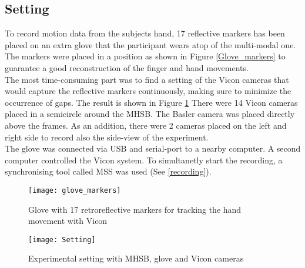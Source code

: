 \subsection{Setting}
To record motion data from the subjects hand, 17 reflective markers has been placed on an extra glove that the participant wears atop of the multi-modal one. The markers were placed in a position as shown in Figure \ref{Glove_markers} to guarantee a good reconstruction of the finger and hand movements.\\
The most time-consuming part was to find a setting of the Vicon cameras that would capture the reflective markers continuously, making sure to minimize the occurrence of gaps. The result is shown in Figure \ref{Setting} There were 14 Vicon cameras placed in a semicircle around the MHSB. The Basler camera was placed directly above the frames. As an addition, there were 2 cameras placed on the left and right side to record also the side-view of the experiment.\\
The glove was connected via USB and serial-port to a nearby computer. A second computer controlled the Vicon system. To simultanetly start the recording, a synchronising tool called MSS was used (See \ref{recording}).

\begin{figure}[H]
	\centering
	\begin{minipage}{0.49\textwidth}
		\centering
		\texttt{[image: glove\_markers]}
		\captionsetup{width=0.9\textwidth}
		\caption{Glove with 17 retroreflective markers for tracking the hand movement with Vicon}
		\label{Glove_markers}
	\end{minipage}
	\begin{minipage}{0.49\textwidth}
		\centering
		\texttt{[image: Setting]}
		\captionsetup{width=0.9\textwidth}
		\caption{Experimental setting with MHSB, glove and Vicon cameras}
		\label{Setting}
	\end{minipage}
\end{figure}
 